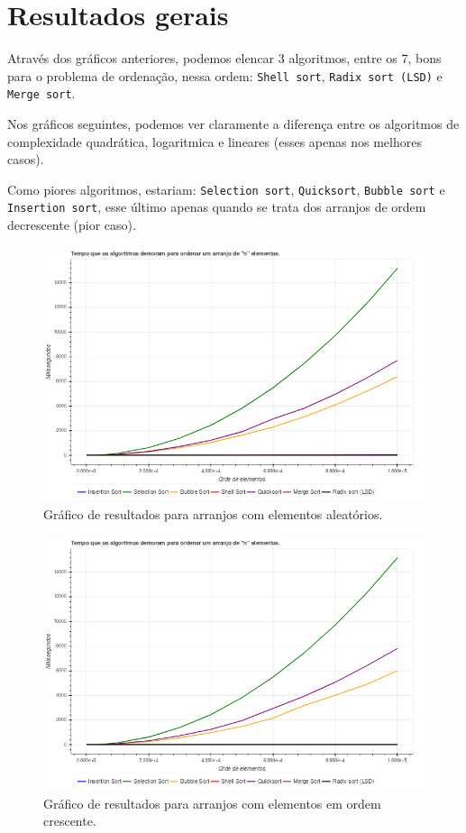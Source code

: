 \section{Resultados gerais}
Através dos gráficos anteriores, podemos elencar 3 algoritmos, entre os 7, bons para o problema de ordenação, nessa ordem: \texttt{Shell sort}, \texttt{Radix sort (LSD)} e \texttt{Merge sort}.

Nos gráficos seguintes, podemos ver claramente a diferença entre os algoritmos de complexidade quadrática, logaritmica e lineares (esses apenas nos melhores casos).

Como piores algoritmos, estariam: \texttt{Selection sort}, \texttt{Quicksort}, \texttt{Bubble sort} e \texttt{Insertion sort}, esse último apenas quando se trata dos arranjos de ordem decrescente (pior caso).

\begin{figure}[H]
	\centering
	\includegraphics[scale=0.6]{img/graficos/aleatorios.png}
	\caption{Gráfico de resultados para arranjos com elementos aleatórios.}
	\label{graph-aleatorios}
\end{figure}

\begin{figure}[H]
	\centering
	\includegraphics[scale=0.6]{img/graficos/crescentes.png}
	\caption{Gráfico de resultados para arranjos com elementos em ordem crescente.}
	\label{graph-crescentes}
\end{figure}

